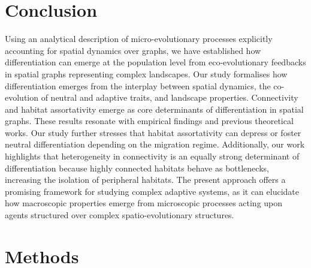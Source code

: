   \section{Conclusion}
  Using an analytical description of micro-evolutionary processes explicitly accounting for spatial dynamics over graphs, we have established how differentiation can emerge at the population level from eco-evolutionary feedbacks in spatial graphs representing complex landscapes.
  Our study formalises how differentiation emerges from the interplay between spatial dynamics, the co-evolution of neutral and adaptive traits, and landscape properties.
  Connectivity and habitat assortativity emerge as core determinants of differentiation in spatial graphs. These results resonate with empirical findings and previous theoretical works. Our study further stresses that habitat assortativity can depress or foster neutral differentiation depending on the migration regime.
  Additionally, our work highlights that heterogeneity in connectivity is an equally strong determinant of differentiation because highly connected habitats behave as bottlenecks, increasing the isolation of peripheral habitats.
  The present approach offers a promising framework for studying complex adaptive systems, as it can elucidate how macroscopic properties emerge from microscopic processes acting upon agents structured over complex spatio-evolutionary structures. %
  
  \section{Methods}
  \label{sec:methods}
  
